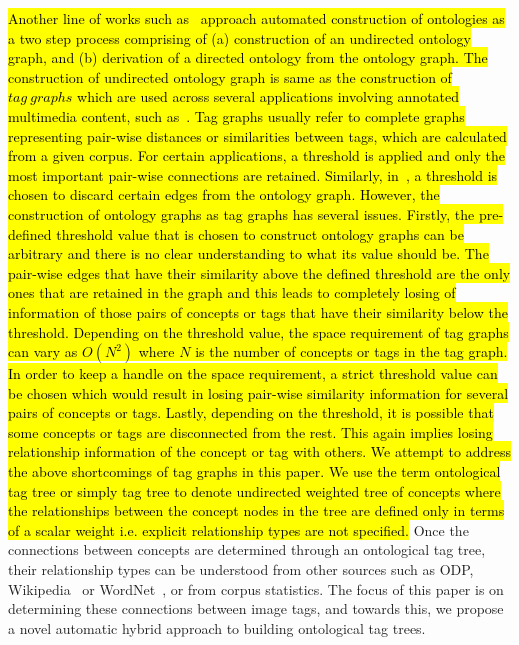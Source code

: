 {\hl{Another line of works such as~{\cite{feiliang2012demo}}{\cite{ren2012cheap}}{\cite{heymann2006collaborative}}  approach automated construction of ontologies as a two step process comprising of (a) construction of an undirected ontology graph, and (b) derivation of a directed ontology from the ontology graph. The construction of undirected ontology graph is same as the construction of {$tag~graphs$} which are used across several applications involving annotated multimedia content, such as{~\cite{liu2009tag}}. 
Tag graphs usually refer to complete graphs representing pair-wise distances or similarities between tags, which are calculated from a given corpus.  For certain applications, a threshold is applied and only the most important pair-wise connections are retained. Similarly, in~{\cite{feiliang2012demo}}{\cite{ren2012cheap}}{\cite{heymann2006collaborative}}, a threshold is chosen to discard certain edges from the ontology graph. However, the construction of ontology graphs as tag graphs has several issues. Firstly, the pre-defined threshold value that is chosen to construct ontology graphs can be arbitrary and there is no clear understanding to what its value should be. The pair-wise edges that have their similarity above the defined threshold are the only ones that are retained in the graph and this leads to completely losing of information of those pairs of concepts or tags that have their similarity below the threshold. Depending on the threshold value, the space requirement of tag graphs can vary as $O(N^2)$ where $N$ is the number of concepts or tags in the tag graph. In order to keep a handle on the space requirement, a strict threshold value can be chosen which would result in losing pair-wise similarity information for several pairs of concepts or tags. Lastly, depending on the threshold, it is possible that some concepts or tags are disconnected from the rest. This again implies losing relationship information of the concept or tag with others. We attempt to address the above shortcomings of tag graphs in this paper. We use the term ontological tag tree or simply tag tree to denote undirected weighted tree of concepts where the relationships between the concept nodes in the tree are defined only in terms of a scalar weight i.e. explicit relationship types are not specified.} Once the connections between concepts are determined through an ontological tag tree, their relationship types can be understood from other sources such as ODP, Wikipedia~\cite{website:Wikipedia} or WordNet~\cite{wordnet}, or from corpus statistics. The focus of this paper is on determining these connections between image tags, and towards this, we propose a novel automatic hybrid approach to building ontological tag trees. 
}
